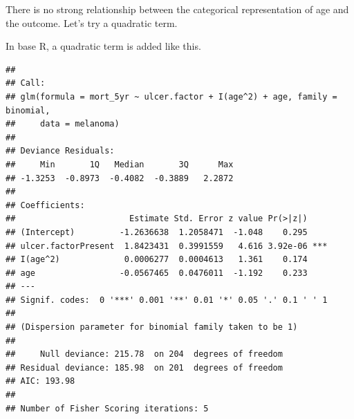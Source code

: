 \documentclass[
  12pt,
  krantz2]{krantz}
\makeatletter
\newenvironment{Shaded}{\begin{snugshade}}{\end{snugshade}}
\newcommand{\DataTypeTok}[1]{\textcolor[rgb]{0.13,0.29,0.53}{#1}}
\newcommand{\DecValTok}[1]{\textcolor[rgb]{0.00,0.00,0.81}{#1}}
\newcommand{\KeywordTok}[1]{\textcolor[rgb]{0.13,0.29,0.53}{\textbf{#1}}}
\newcommand{\NormalTok}[1]{#1}
\newcommand{\OperatorTok}[1]{\textcolor[rgb]{0.81,0.36,0.00}{\textbf{#1}}}
\newcommand{\StringTok}[1]{\textcolor[rgb]{0.31,0.60,0.02}{#1}}
\newenvironment{kframe}{%
\medskip{}
\setlength{\fboxsep}{.8em}
 \def\at@end@of@kframe{}%
 \ifinner\ifhmode%
  \def\at@end@of@kframe{\end{minipage}}%
  \begin{minipage}{\columnwidth}%
 \fi\fi%
 \def\FrameCommand##1{\hskip\@totalleftmargin \hskip-\fboxsep
 \colorbox{shadecolor}{##1}\hskip-\fboxsep
     \hskip-\linewidth \hskip-\@totalleftmargin \hskip\columnwidth}%
 \MakeFramed {\advance\hsize-\width
   \@totalleftmargin\z@ \linewidth\hsize
   \@setminipage}}%
 {\par\unskip\endMakeFramed%
 \at@end@of@kframe}
\renewenvironment{Shaded}{\begin{kframe}}{\end{kframe}}
\makeatother
\begin{document}
\begin{table}[!h]

\caption{\label{tab:unnamed-chunk-22}Model metrics: using `cut` to convert a continuous variable as a factor (fit 3).}
\centering
{}
\end{table}

There is no strong relationship between the categorical representation of age and the outcome.
Let's try a quadratic term.

In base R, a quadratic term is added like this.

\begin{Shaded}
\end{Shaded}

\begin{verbatim}
## 
## Call:
## glm(formula = mort_5yr ~ ulcer.factor + I(age^2) + age, family = binomial, 
##     data = melanoma)
## 
## Deviance Residuals: 
##     Min       1Q   Median       3Q      Max  
## -1.3253  -0.8973  -0.4082  -0.3889   2.2872  
## 
## Coefficients:
##                       Estimate Std. Error z value Pr(>|z|)    
## (Intercept)         -1.2636638  1.2058471  -1.048    0.295    
## ulcer.factorPresent  1.8423431  0.3991559   4.616 3.92e-06 ***
## I(age^2)             0.0006277  0.0004613   1.361    0.174    
## age                 -0.0567465  0.0476011  -1.192    0.233    
## ---
## Signif. codes:  0 '***' 0.001 '**' 0.01 '*' 0.05 '.' 0.1 ' ' 1
## 
## (Dispersion parameter for binomial family taken to be 1)
## 
##     Null deviance: 215.78  on 204  degrees of freedom
## Residual deviance: 185.98  on 201  degrees of freedom
## AIC: 193.98
## 
## Number of Fisher Scoring iterations: 5
\end{verbatim}
\end{document}
